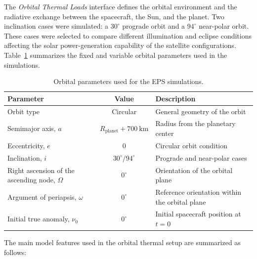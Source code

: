 The \textit{Orbital Thermal Loads} interface defines the orbital environment and the radiative exchange between the spacecraft, the Sun, and the planet. Two inclination cases were simulated: a \(30^\circ\) prograde orbit and a \(94^\circ\) near-polar orbit. These cases were selected to compare different illumination and eclipse conditions affecting the solar power-generation capability of the satellite configurations. Table~\ref{tab:orbital_params} summarizes the fixed and variable orbital parameters used in the simulations.

\begin{table}[h!]
\centering
\caption{Orbital parameters used for the EPS simulations.}
\label{tab:orbital_params}
\renewcommand{\arraystretch}{1.5}
\begin{tabular}{|l|c|l|}
\hline
\textbf{Parameter} & \textbf{Value} & \textbf{Description} \\ \hline
Orbit type & Circular & General geometry of the orbit \\ \hline
Semimajor axis, \(a\) & \(R_{\mathrm{planet}} + 700~\mathrm{km}\) & Radius from the planetary center \\ \hline
Eccentricity, \(e\) & \(0\) & Circular orbit condition \\ \hline
Inclination, \(i\) & \(30^\circ / 94^\circ\) & Prograde and near-polar cases \\ \hline
Right ascension of the ascending node, \(\Omega\) & \(0^\circ\) & Orientation of the orbital plane \\ \hline
Argument of periapsis, \(\omega\) & \(0^\circ\) & Reference orientation within the orbital plane \\ \hline
Initial true anomaly, \(\nu_0\) & \(0^\circ\) & Initial spacecraft position at \(t=0\) \\ \hline
\end{tabular}
\end{table}

The main model features used in the orbital thermal setup are summarized as follows:

